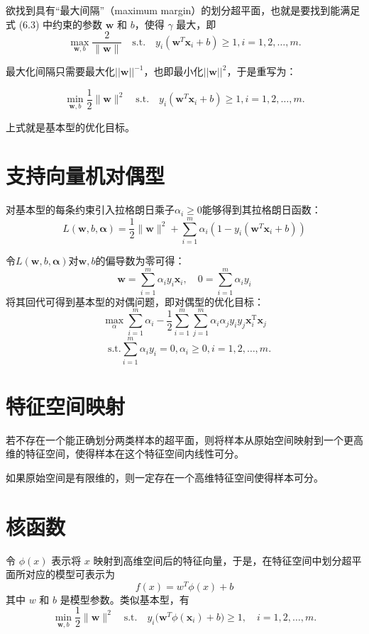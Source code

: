 欲找到具有“最大间隔”（maximum margin）的划分超平面，也就是要找到能满足式 (6.3) 中约束的参数 $\boldsymbol w$ 和 $b$，使得 $\gamma$ 最大，即
\[
\max_{\boldsymbol w, b} \frac{2}{\|\boldsymbol w\|} \quad \text{s.t.}\quad y_i(\boldsymbol w^T \boldsymbol x_i + b) \geq 1, i = 1, 2, \ldots, m.
\]

最大化间隔只需要最大化$||\boldsymbol w||^{-1}$，也即最小化$||\boldsymbol w||^{2}$，于是重写为：

\[
\min_{\boldsymbol w, b} \frac{1}{2}\| \boldsymbol w\|^2 \quad \text{s.t.}\quad y_i(\boldsymbol w^T \boldsymbol x_i + b) \geq 1, i = 1, 2, \ldots, m.
\]

上式就是基本型的优化目标。

\section{支持向量机对偶型}\label{sec:4.3}
对基本型的每条约束引入拉格朗日乘子$\alpha_i \ge 0$能够得到其拉格朗日函数：\[
L(\boldsymbol{w}, b, \boldsymbol{\alpha})=\frac{1}{2}\|\boldsymbol{w}\|^{2}+\sum_{i=1}^{m} \alpha_{i}\left(1-y_{i}\left(\boldsymbol{w}^{T} \boldsymbol{x}_{i}+b\right)\right)
\]

令$L(\boldsymbol{w}, b, \boldsymbol{\alpha})$对$\boldsymbol w, b$的偏导数为零可得：
\[
\boldsymbol{w}=\sum_{i=1}^{m} \alpha_{i} y_{i} \boldsymbol{x}_{i}, \quad 0=\sum_{i=1}^{m} \alpha_{i} y_{i}
\]
将其回代可得到基本型的对偶问题，即对偶型的优化目标：
\[
\max_{\alpha} \sum_{i=1}^m\alpha_i - \frac{1}{2}\sum_{i=1}^{m}\sum_{j=1}^m \alpha_i\alpha_j y_i y_j\boldsymbol x_i^{\mathrm{T}}\boldsymbol x_j \]
\[\quad \text{s.t.}\sum_{i=1}^m\alpha_iy_i = 0, \alpha_i \ge 0, i= 1, 2, \ldots, m.
\]

\section{特征空间映射}\label{sec:4.4}

若不存在一个能正确划分两类样本的超平面，则将样本从原始空间映射到一个更高维的特征空间，使得样本在这个特征空间内线性可分。

如果原始空间是有限维的，则一定存在一个高维特征空间使得样本可分。

\section{核函数}\label{sec:4.5}
令 $\phi(x)$ 表示将 $x$ 映射到高维空间后的特征向量，于是，在特征空间中划分超平面所对应的模型可表示为
\[
f(x) = w^T \phi(x) + b
\]
其中 $w$ 和 $b$ 是模型参数。类似基本型，有
\[
\min_{\boldsymbol w, b} \frac{1}{2} \|\boldsymbol w\|^2\quad \text{s.t.} \quad y_i \big(\boldsymbol w^T \phi(\boldsymbol x_i) + b\big) \geq 1, \quad i = 1, 2, \ldots, m.
\]

